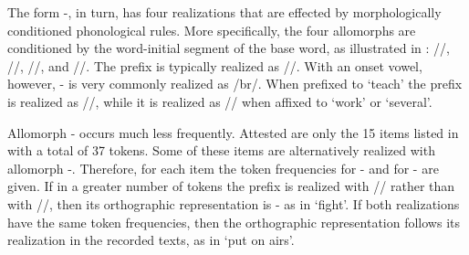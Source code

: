 The form -, in turn, has four realizations that are effected by morphologically conditioned phonological rules. More specifically, the four allomorphs are conditioned by the word-initial segment of the base word, as illustrated in : //, //, //, and //. The prefix is typically realized as //. With an onset vowel, however, - is very commonly realized as /br\textstyleChCharisSIL{-}/. When prefixed to  ‘teach’ the prefix is realized as //, while it is realized as // when affixed to  ‘work’ or  ‘several’.

Allomorph - occurs much less frequently. Attested are only the 15 items listed in  with a total of 37 tokens. Some of these items are alternatively realized with allomorph -. Therefore, for each item the token frequencies for - and for - are given. If in a greater number of tokens the prefix is realized with // rather than with //, then its orthographic representation is - as in  ‘fight’. If both realizations have the same token frequencies, then the orthographic representation follows its realization in the recorded texts, as in  ‘put on airs’.


